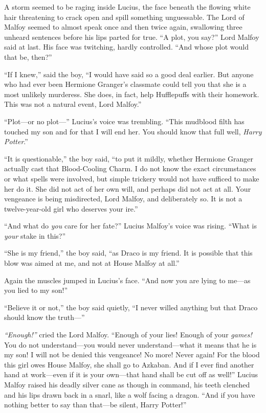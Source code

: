 A storm seemed to be raging inside Lucius, the face beneath the flowing
white hair threatening to crack open and spill something unguessable.
The Lord of Malfoy seemed to almost speak once and then twice again,
swallowing three unheard sentences before his lips parted for true. ``A
plot, you say?'' Lord Malfoy said at last. His face was twitching,
hardly controlled. ``And whose plot would that be, then?''

``If I knew,'' said the boy, ``I would have said so a good deal earlier.
But anyone who had ever been Hermione Granger's classmate could tell you
that she is a most unlikely murderess. She does, in fact, help
Hufflepuffs with their homework. This was not a natural event, Lord
Malfoy.''

``Plot---or no plot---'' Lucius's voice was trembling. ``This mudblood
filth has touched my son and for that I will end her. You should know
that full well, \emph{Harry Potter}.''

``It is questionable,'' the boy said, ``to put it mildly, whether
Hermione Granger actually cast that Blood-Cooling Charm. I do not know
the exact circumstances or what spells were involved, but simple
trickery would not have sufficed to make her do it. She did not act of
her own will, and perhaps did not act at all. Your vengeance is being
misdirected, Lord Malfoy, and deliberately so. It is not a
twelve-year-old girl who deserves your ire.''

``And what do \emph{you} care for her fate?'' Lucius Malfoy's voice was
rising. ``What is \emph{your} stake in this?''

``She is my friend,'' the boy said, ``as Draco is my friend. It is
possible that this blow was aimed at me, and not at House Malfoy at
all.''

Again the muscles jumped in Lucius's face. ``And now you are lying to
me---as you lied to my son!''

``Believe it or not,'' the boy said quietly, ``I never willed anything
but that Draco should know the truth---''

\emph{``Enough!''} cried the Lord Malfoy. ``Enough of your lies! Enough
of your \emph{games!} You do not understand---you would never
understand---what it means that he is my son! I will not be denied this
vengeance! No more! Never again! For the blood this girl owes House
Malfoy, she shall go to Azkaban. And if I ever find another hand at
work---even if it is your own---that hand shall be cut off as well!''
Lucius Malfoy raised his deadly silver cane as though in command, his
teeth clenched and his lips drawn back in a snarl, like a wolf facing a
dragon. ``And if you have nothing better to say than that---be silent,
Harry Potter!''

